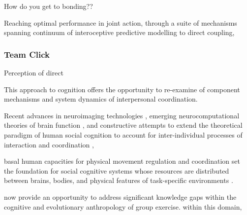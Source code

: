 \begin{CJK}{UTF8}{gbsn}
{How do you get to bonding??


Reaching optimal performance in joint action, through a suite of mechanisms spanning continuum of interoceptive predictive modelling to direct coupling,

\subsubsection{Team Click}
Perception of direct













































This approach to cognition offers the opportunity to re-examine of component mechanisms and system dynamics of interpersonal coordination.


Recent advances in neuroimaging technologies \citep{Frith2007}, emerging neurocomputational theories of brain function \citep{Friston2010,Frith2010,Clark2013}, and constructive attempts to extend the theoretical paradigm of human social cognition to account for inter-individual processes of interaction and coordination \citep{Sebanz2006,Dale2014},

 basal human capacities for physical movement regulation and coordination set the foundation for social cognitive systems whose resources are distributed between brains, bodies, and physical features of task-specific environments \citep{Hutchins2000,Kirsh2006,Semin2008,Semin2012,Coey2012}.



now provide an opportunity to address significant knowledge gaps within the cognitive and evolutionary anthropology of group exercise.   within this domain,


}
\end{CJK}
